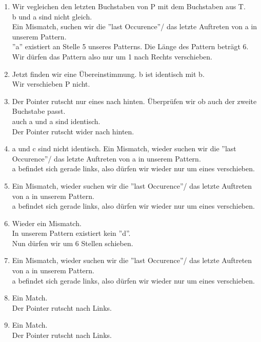 \documentclass[a4paper,10pt]{report}
\begin{document}
\begin{enumerate}
	\item
		Wir vegleichen den letzten Buchstaben von P mit dem Buchstaben aus T.\\
		b und a sind nicht gleich.\\
		Ein Mismatch,  suchen wir die ''last Occurence''/ das letzte Auftreten von a in unserem Pattern.\\
		''a'' existiert an Stelle 5 unseres Patterns. Die Länge des Pattern beträgt 6.\\
		Wir dürfen das Pattern also nur um 1 nach Rechts verschieben.
	\item
		Jetzt finden wir eine Übereinstimmung. b ist identisch mit b.\\
		Wir verschieben P nicht.\\
	\item
		Der Pointer rutscht nur eines nach hinten.
		Überprüfen wir ob auch der zweite Buchstabe passt.\\
		auch a und a sind identisch.\\
		Der Pointer rutscht wider nach hinten.\\
	\item
		a und c sind nicht identisch.
		Ein Mismatch, wieder suchen wir die ''last Occurence''/ das letzte Auftreten von a in unserem Pattern.\\
		a befindet sich gerade links, also dürfen wir wieder nur um eines verschieben.
	\item
		Ein Mismatch, wieder suchen wir die ''last Occurence''/ das letzte Auftreten von a in unserem Pattern.\\
		a befindet sich gerade links, also dürfen wir wieder nur um eines verschieben.
	\item
		Wieder ein Mismatch. \\
		In unserem Pattern existiert kein ''d''.\\
		Nun dürfen wir um 6 Stellen schieben.
	\item
		Ein Mismatch, wieder suchen wir die ''last Occurence''/ das letzte Auftreten von a in unserem Pattern.\\
		a befindet sich gerade links, also dürfen wir wieder nur um eines verschieben.
	\item
		Ein Match.\\
		Der Pointer rutscht nach Links.\\
	\item
		Ein Match.\\
		Der Pointer rutscht nach Links.\\

\end{enumerate}
\end{document}
